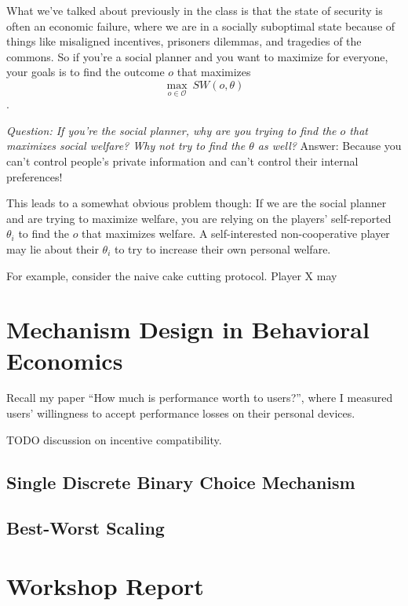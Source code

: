 \documentclass[11pt]{article}
\begin{document}
What we've talked about previously in the class is that the state of security is often an economic failure, where we are in a socially suboptimal state because of things like misaligned incentives, prisoners dilemmas, and tragedies of the commons. 
So if you're a social planner and you want to maximize for everyone, your goals is to find the outcome $o$ that maximizes 
$$ \max_{o \in \mathcal{O}}~SW(o, \theta)$$.

{\it Question: If you're the social planner, why are you trying to find the $o$ that maximizes social welfare? Why not try to find the $\theta$ as well?} Answer: Because you can't control people's private information and can't control their internal preferences!

This leads to a somewhat obvious problem though: If we are the social planner and are trying to maximize welfare, you are relying on the players' self-reported $\theta_i$ to find the $o$ that maximizes welfare. A self-interested non-cooperative player may lie about their $\theta_i$ to try to increase their own personal welfare. 

For example, consider the naive cake cutting protocol. Player X may 

\section{Mechanism Design in Behavioral Economics}

Recall my paper ``How much is performance worth to users?'', where I measured users' willingness to accept performance losses on their personal devices. 

TODO discussion on incentive compatibility. 

\subsection{Single Discrete Binary Choice Mechanism}

\subsection{Best-Worst Scaling}

\subsection{}

\section{Workshop Report}
\end{document}
